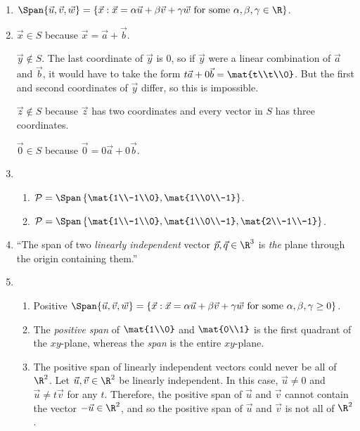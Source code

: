 		\begin{enumerate}
			\item $\Span\{\vec u,\vec v,\vec w\}=\{\vec x:\vec x=\alpha\vec u+\beta\vec v+\gamma \vec w\text{ for some }\alpha,\beta,\gamma\in \R\}$.
			\item $\vec x\in S$ because $\vec x=\vec a+\vec b$.
				
				$\vec y\notin S$. The last coordinate of $\vec y$ is $0$, so if $\vec y$ were a linear combination of
				$\vec a$ and $\vec b$, it would have to take the form $t\vec a+0\vec b=\mat{t\\t\\0}$. But the first
				and second coordinates of $\vec y$ differ, so this is impossible.

				$\vec z\notin S$ because $\vec z$ has two coordinates and every vector in $S$ has three
				coordinates.
				
				$\vec 0\in S$ because $\vec 0=0\vec a+0\vec b$.
			\item \begin{enumerate}
					\item $\mathcal P=\Span\left\{\mat{1\\-1\\0},\mat{1\\0\\-1}\right\}$.
					\item $\mathcal P=\Span\left\{\mat{1\\-1\\0},\mat{1\\0\\-1}, \mat{2\\-1\\-1}\right\}$.
			\end{enumerate}
			\item ``The span of two \emph{linearly independent} vector $\vec p,\vec q\in \R^3$ is \emph{the} plane through
				the origin containing them.''
			\item \begin{enumerate}
				\item Positive $\Span\{\vec u,\vec v,\vec w\}=\{\vec x:\vec x=\alpha\vec u+\beta\vec v+\gamma \vec w\text{ for some }\alpha,\beta,\gamma\geq 0\}$.
				\item The \emph{positive span} of $\mat{1\\0}$ and $\mat{0\\1}$ is the first quadrant of the $xy$-plane, whereas
					the \emph{span} is the entire $xy$-plane.
				\item The positive span of linearly independent vectors could never be all of $\R^2$.
					Let $\vec u,\vec v\in \R^2$ be linearly independent.
					In this case, $\vec u\neq 0$ and $\vec u\neq t\vec v$ for any $t$.
					Therefore, the positive span of $\vec u$ and $\vec v$ cannot contain the vector $-\vec u\in \R^2$,
					and so the positive span of $\vec u$ and $\vec v$ is not all of $\R^2$.


\end{enumerate}
\end{enumerate}
